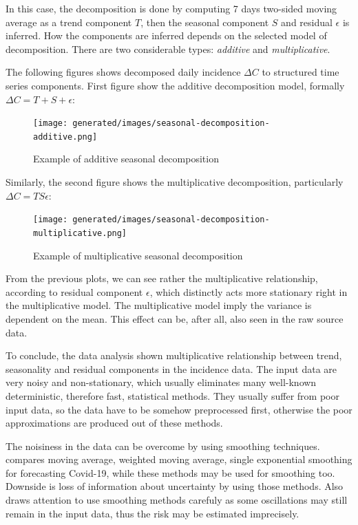 \documentclass[
  digital, %
  oneside, %
  lof,     %
  lot,     %
]{fithesis4}
\begin{document}
In this case, the decomposition is done by computing 7 days 
two-sided moving average as a trend component $T$, then the 
seasonal component $S$ and residual $\epsilon$ is inferred. 
How the components are inferred depends on the selected model 
of decomposition. There are two considerable types: 
\textit{additive} and \textit{multiplicative}.

The following figures shows decomposed daily incidence 
$\Delta C$ to structured time series components. 
First figure show the additive decomposition model, 
formally $\Delta C = T + S + \epsilon$:

\begin{figure}[h]
  \begin{center}
    \texttt{[image: generated/images/seasonal-decomposition-additive.png]}
  \end{center}
  \caption{Example of additive seasonal decomposition}
  \label{fig:seasonal-decomposition-additive}
\end{figure}

Similarly, the second figure shows the multiplicative 
decomposition, particularly $\Delta C = T S \epsilon$:

\begin{figure}[h]
  \begin{center}
    \texttt{[image: generated/images/seasonal-decomposition-multiplicative.png]}
  \end{center}
  \caption{Example of multiplicative seasonal decomposition}
  \label{fig:seasonal-decomposition-multiplicative}
\end{figure}

From the previous plots, we can see rather the multiplicative 
relationship, according to residual component $\epsilon$, 
which distinctly acts more stationary right in the 
multiplicative model. 
The multiplicative model imply the variance is dependent 
on the mean. This effect can be, after all, also seen 
in the raw source data.

To conclude, the data analysis shown multiplicative 
relationship between trend, seasonality and residual 
components in the incidence data. 
The input data are very noisy and non-stationary, which 
usually eliminates many well-known deterministic, therefore 
fast, statistical methods. 
They usually suffer from poor input data, so the data have 
to be somehow preprocessed first, otherwise the poor 
approximations are produced out of these methods.

The noisiness in the data can be overcome by using 
smoothing techniques.
\cite{elmousalami2020} compares moving average, weighted 
moving average, single exponential smoothing for 
forecasting Covid-19, while these methods may be used 
for smoothing too. 
Downside is loss of information about uncertainty by using 
those methods. 
Also \cite{annunziato2020} draws attention to use smoothing 
methods carefuly as some oscillations may still remain in 
the input data, thus the risk may be estimated imprecisely.
\end{document}
